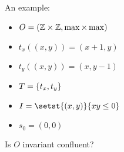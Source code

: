 \begin{frame}
  \Large
  An example:
  \begin{itemize}
    \item $O = (\mathbb{Z} \times \mathbb{Z}, \max \times \max)$
    \item $t_x((x, y)) = (x + 1, y)$
    \item $t_y((x, y)) = (x, y - 1)$
    \item $T = \{t_x, t_y\}$
    \item $I = \setst{(x, y)}{xy \leq 0}$
    \item $s_0 = (0, 0)$
  \end{itemize}
  Is $O$ invariant confluent?

\end{frame}

